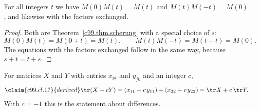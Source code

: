\begin{fundament}[id=c99.f1,
    titel={The shears form a group},
    wozu={The core uses only the product of two shears; here we collect what
      follows from it for the whole family.},
    voraussetzung={Core~\ref{c99.s2.1}, Theorem~\ref{c99.thm.scherung}.},
    zurueck={Every shear $M(t)$ is undone by $M(-t)$.}]
  \begin{proposition}\label{c99.prop.gruppe}
    For all integers $t$ we have $M(0)M(t) = M(t)$ and $M(t)M(-t) = M(0)$,
    and likewise with the factors exchanged.
  \end{proposition}
  \begin{proof}
    Both are Theorem~\ref{c99.thm.scherung} with a special choice of $s$:
    \begin{equation}\label{c99.eq.gruppe}
      M(0)M(t) = M(0 + t) = M(t),
      \qquad
      M(t)M(-t) = M(t - t) = M(0).
    \end{equation}
    The equations with the factors exchanged follow in the same way, because
    $s + t = t + s$.
  \end{proof}
\end{fundament}

\begin{fundament}[id=c99.f2,
    titel={The trace respects sums},
    wozu={The deeper block uses that the trace of a difference is the difference
      of the traces; here is the computation.},
    voraussetzung={\defref{T1}.},
    zurueck={From $\tr(AB) = \tr(BA)$ it therefore follows that $\tr(AB - BA) = 0$.}]
  For matrices $X$ and $Y$ with entries $x_{jk}$ and $y_{jk}$ and an integer $c$,
  \begin{equation}\label{c99.eq.spur-linear}\claim{c99.cl.17}{derived}
    \tr(X + cY) = (x_{11} + c\,y_{11}) + (x_{22} + c\,y_{22})
                = \tr X + c\,\tr Y.
  \end{equation}
  With $c = -1$ this is the statement about differences.
\end{fundament}
